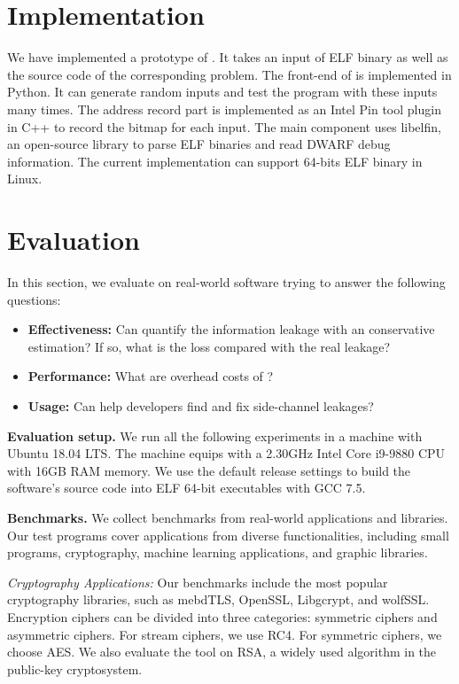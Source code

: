 \section{Implementation}
We have implemented a prototype of \ctool{}. It takes an input of ELF binary as well as the source code of the corresponding problem. The front-end of \ctool{} is implemented in Python. It can generate random inputs and test the program with these inputs many times.  The address record part is implemented as an Intel Pin tool plugin in C++ to record the bitmap for each input. The main component uses \textsf{libelfin}, an open-source library to parse ELF binaries and read DWARF debug information. The current implementation can support  64-bits ELF binary in Linux. 

\section{Evaluation}
In this section, we evaluate \ctool{} on real-world software trying to answer the following questions:

\begin{itemize}
\item \textbf{Effectiveness:} Can \ctool{} quantify the information leakage with an conservative estimation? If so, what is the loss compared with the real leakage?
\item \textbf{Performance:} What are overhead costs of \ctool{}?
\item \textbf{Usage:}  Can \ctool{} help developers find and fix side-channel leakages?
\end{itemize}

\textbf{Evaluation setup.} We run all the following experiments in a machine with Ubuntu 18.04 LTS. The machine equips with a 2.30GHz Intel Core i9-9880 CPU with 16GB RAM memory. We use the default release settings to build the software's source code into ELF 64-bit executables with GCC 7.5. 

\textbf{Benchmarks.} 
We collect benchmarks from real-world applications and libraries. Our test programs cover applications from diverse functionalities, including small programs, cryptography, machine learning applications, and graphic libraries. 



\textit{Cryptography Applications:} Our benchmarks include the most popular cryptography libraries, such as mebdTLS, OpenSSL, Libgcrypt, and wolfSSL. Encryption ciphers can be divided into three categories:  symmetric ciphers and asymmetric ciphers. For stream ciphers, we use RC4. For symmetric ciphers, we choose AES. We also evaluate the tool on RSA, a widely used algorithm in the public-key cryptosystem.

